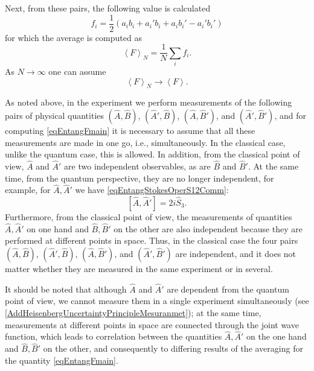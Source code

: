 Next, from these pairs, the following value is calculated
\begin{equation}
f_i = \frac{1}{2}\left(
a_i b_i + a_i' b_i + a_i b_i' - a_i' b_i'
\right)
\nonumber
\end{equation}
for which the average is computed as
\begin{equation}
\left<F\right>_N = \frac{1}{N}\sum_i f_i.
\label{eqEntangFmain}
\end{equation}
As $N \rightarrow \infty$ one can assume
\begin{equation}
\left<F\right>_N \rightarrow \left<F\right>.
\nonumber
\end{equation}

\begin{remark}
As noted above, in the experiment we perform measurements of the following
pairs of physical quantities $\left(\hat{A},\hat{B}\right)$,
$\left(\hat{A}',\hat{B}\right)$, $\left(\hat{A},\hat{B}'\right)$, and
$\left(\hat{A}',\hat{B}'\right)$, and for computing
\eqref{eqEntangFmain} it is necessary to assume that all these measurements
are made in one go, i.e., simultaneously. In the classical case, unlike the quantum case, this is allowed. In addition,
from the classical point of view, $\hat{A}$ and $\hat{A}'$ are two independent
observables,
as are $\hat{B}$ and $\hat{B}'$. At the same time, from the quantum perspective,
they are no longer independent, for example, for $\hat{A}, \hat{A}'$ we have \eqref{eqEntangStokesOperS12Comm}:
\[
\left[\hat{A}, \hat{A}'\right] = 2 i \hat{S}_3.
\] 
Furthermore, from the classical point of view, the measurements of quantities
$\hat{A}, \hat{A}'$ on one hand and $\hat{B}, \hat{B}'$ on the other are also
independent because they are performed at different points in space.
Thus, in the classical case the four pairs $\left(\hat{A},\hat{B}\right)$,
$\left(\hat{A}',\hat{B}\right)$, $\left(\hat{A},\hat{B}'\right)$, and
$\left(\hat{A}',\hat{B}'\right)$
are independent, and it does not matter whether they are measured in the same experiment 
or in several.

It should be noted that although $\hat{A}$ and $\hat{A}'$
are dependent from the quantum point of view, we cannot measure them
in a single experiment simultaneously (see
\autoref{AddHeisenbergUncertaintyPrincipleMesuranmet}); at the same time,
measurements at different points in space are connected through the joint wave
function, which leads to correlation between the quantities $\hat{A}, \hat{A}'$ on the one hand and
$\hat{B}, \hat{B}'$ on the other, and consequently to differing results of the averaging for the quantity \eqref{eqEntangFmain}.
\end{remark}

